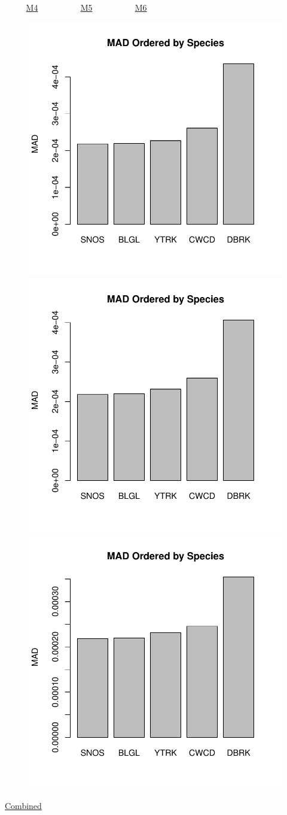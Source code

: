 \documentclass[ xcolor = pdftex, dvipsnames, table ]{beamer}
\begin{document}
\begin{frame}{$~~~~~~~~~~$ \href{https://github.com/gasduster99/sppComp/tree/master/sscRuns/25319781982M4}{M4} $~~~~~~~~~~~~~~~~~~~~$ \href{https://github.com/gasduster99/sppComp/tree/master/sscRuns/25319781982M5}{M5} $~~~~~~~~~~~~~~~~~~~~$ \href{https://github.com/gasduster99/sppComp/tree/master/sscRuns/25319781982M6}{M6} }	
	\begin{figure}[ht!]
        \centering
	\hspace*{-1cm}
        \includegraphics[width=.4\textwidth]{../sscRuns/25319781982M4/sppTailMad68.pdf}
        \includegraphics[width=.4\textwidth]{../sscRuns/25319781982M5/sppTailMad68.pdf}
	\includegraphics[width=.4\textwidth]{../sscRuns/25319781982M6/sppTailMad68.pdf}
	\end{figure}
	\vspace{-1cm}
	\begin{center}
	\Large
	\href{https://github.com/gasduster99/sppComp/tree/master/try1/postSSC/25319781982M4M5M6}{Combined}
	\end{center}
\end{frame}
\end{document}
